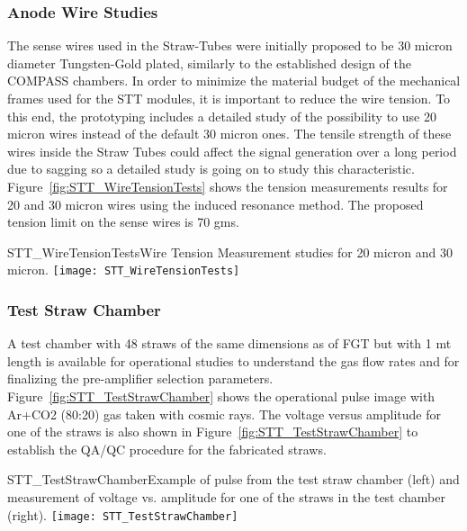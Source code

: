 \subsubsection{Anode Wire Studies} 

The sense wires used in the Straw-Tubes were initially proposed to be 30 micron diameter 
Tungsten-Gold plated, similarly to the established design of the COMPASS chambers. In order to minimize 
the material budget of the mechanical frames used for the STT modules, it is important to reduce 
the wire tension. To this end, the prototyping includes a detailed study of the possibility to use 
20 micron wires instead of the default 30 micron ones. The tensile strength of these wires inside the 
Straw Tubes could affect the signal generation over a long period due to sagging so a detailed study 
is going on to study this characteristic. Figure~\ref{fig:STT_WireTensionTests} shows 
the tension measurements results for 20 and 30 micron wires using the induced resonance method. 
The proposed tension limit on the sense wires is 70 gms.

\begin{cdrfigure}           
{STT_WireTensionTests}{Wire Tension Measurement studies for 20 micron and 30 micron.}
\texttt{[image: STT\_WireTensionTests]}
\end{cdrfigure}


\subsubsection{Test Straw Chamber} 

A test chamber with 48 straws of the same dimensions as of FGT but with 1 mt length is available for 
operational studies to understand the gas flow rates and for finalizing the pre-amplifier selection parameters. 
Figure~\ref{fig:STT_TestStrawChamber} shows the operational pulse image with Ar+CO2 (80:20) gas taken with 
cosmic rays. The voltage versus amplitude for one of the straws is also shown in 
Figure~\ref{fig:STT_TestStrawChamber} to establish the QA/QC procedure for the fabricated straws. 

\begin{cdrfigure}  
{STT_TestStrawChamber}{Example of pulse from the test straw chamber (left) and 
measurement of voltage vs. amplitude for one of the straws in the test chamber (right).}
\texttt{[image: STT\_TestStrawChamber]}
\end{cdrfigure}


